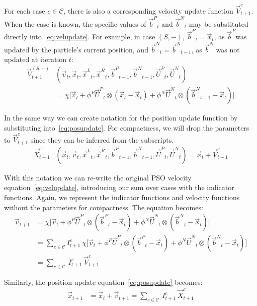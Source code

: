 \documentclass[smallcondensed]{svjour3}
\providecommand{\pers}{\ensuremath{P}}
\providecommand{\neigh}{\ensuremath{N}}
\providecommand{\leftind}{\ensuremath{L}}
\providecommand{\rightind}{\ensuremath{R}}
\providecommand{\nURand}{\ensuremath{\Vec{U}^\neigh}}
\providecommand{\pURand}{\ensuremath{\Vec{U}^\pers}}
\providecommand{\ppos}{\ensuremath{\Vec{x}}}
\providecommand{\pvel}{\ensuremath{\Vec{v}}}
\providecommand{\nbest}{\ensuremath{\Vec{b}^\neigh}}
\providecommand{\pbest}{\ensuremath{\Vec{b}^\pers}}
\providecommand{\constriction}{\ensuremath{\chi}}
\providecommand{\ncoeff}{\ensuremath{\phi^\neigh}}
\providecommand{\pcoeff}{\ensuremath{\phi^\pers}}
\providecommand{\indic}{\ensuremath{I}}
\providecommand{\specvel}{\ensuremath{\Vec{V}}}
\providecommand{\specpos}{\ensuremath{\Vec{X}}}
\providecommand{\leftn}{\ensuremath{\Vec{x}^\leftind}}
\providecommand{\rightn}{\ensuremath{\Vec{x}^\rightind}}
\providecommand{\caseset}{\ensuremath{\mathcal{C}}}
\providecommand{\casegen}{\ensuremath{c}}
\providecommand{\casexn}{\ensuremath{(S,-)}}
\begin{document}
For each case $\casegen \in \caseset$, there is also a corresponding
velocity update function $\specvel_{t+1}^{\casegen}$.  When the case is
known, the specific values of $\pbest_t$ and $\nbest_t$ may be substituted
directly into~\eqref{eq:velupdate}.  For example, in case $\casexn$,
$\pbest_{t}=\ppos_{t}$, as \pbest was updated by the particle's current
position, and $\nbest_{t}=\nbest_{t-1}$, as $\nbest$ was not updated at
iteration $t$:
\begin{align}
\nonumber
	\specvel_{t+1}^{\casexn} & (\pvel_t, \ppos_{t}, \leftn_{t}, \rightn_{t},
	\pbest_{t-1}, \nbest_{t-1}, \pURand_{t}, \nURand_{t}) \\
\label{eq:defvcasexn}
		&= \constriction \bigl[ \pvel_{t} +
			\pcoeff\pURand_{t}\otimes(\ppos_{t} - \ppos_{t})
			+ \ncoeff\nURand_{t}\otimes(\nbest_{t-1} -
			\ppos_{t}) \bigr]
\end{align}

In the same way we can create notation for the position update function by
substituting into~\eqref{eq:posupdate}.  For compactness, we will drop the
parameters to $\specvel_{t+1}^{\casegen}$ since they can be inferred from the
subscripts.
\begin{align}
\label{eq:defpcasegen}
	\specpos_{t+1}^{\casegen} & (\ppos_{t}, \pvel_{t}, \leftn_{t},
	\rightn_{t} ,\pbest_{t-1} ,\nbest_{t-1}, \pURand_{t}, \nURand_{t})
	= \ppos_{t} + \specvel_{t+1}^{\casegen}
\end{align}

With this notation we can re-write the original PSO velocity
equation~\eqref{eq:velupdate}, introducing our sum over cases with the
indicator functions.  Again, we represent the indicator functions and velocity
functions without the parameters for compactness.  The equation becomes:
\begin{align}
\nonumber
	\pvel_{t+1} &=
		\constriction \bigl[ \pvel_t
			+ \pcoeff\pURand_{t}\otimes(\pbest_{t} - \ppos_{t})
			+ \ncoeff\nURand_{t}\otimes(\nbest_{t} -
			\ppos_{t}) \bigr] \\
\nonumber
	&= \sum_{c \in \caseset} \indic_{t+1}^{c} \ \constriction \bigl[ \pvel_t
			+ \pcoeff\pURand_{t}\otimes(\pbest_{t} - \ppos_{t})
			+ \ncoeff\nURand_{t}\otimes(\nbest_{t} -
			\ppos_{t}) \bigr]  \\
\label{eq:vel2update}
	&= \sum_{c \in \caseset} \ \indic_{t+1}^{c} \ \specvel_{t+1}^{c}
\end{align}

Similarly, the position update equation~\eqref{eq:posupdate} becomes:
\begin{align}
\label{eq:pos2update}
	\ppos_{t+1} &= \ppos_{t} + \pvel_{t+1}
	= \sum_{c \in \caseset} \ \indic_{t+1}^{c} \ \specpos_{t+1}^{c} 
\end{align}
\end{document}
